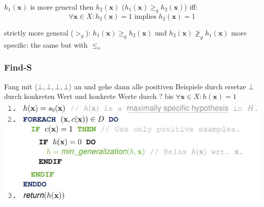 \documentclass[11pt,a4paper]{article}
\begin{document}
\begin{flushleft}
$h_1(\textbf{x})$ is more general then $h_2(\textbf{x})$ ($h_1(\textbf{x})\geq_g h_2(\textbf{x})$) iff: 
$$ \forall \textbf{x} \in X: h_2(\textbf{x})=1 \text{ implies } h_2(\textbf{x})=1 $$
 
strictly more general ($>_g$): $h_1(\textbf{x})\geq_g h_2(\textbf{x})$ und $h_2(\textbf{x})\ngeq_g h_1(\textbf{x})$
more specific: the same but with $\leq_s $ 
 
\subsubsection{Find-S}
Fang mit $ \langle \bot,\bot, \bot, \bot \rangle $ an und gehe dann alle positiven Beispiele durch
ersetze $ \bot $ durch konkreten Wert und konkrete Werte durch ? bis $\forall \textbf{x} \in X : h(\textbf{x})= 1$ 
\includegraphics[width=\textwidth]{FindS}


\end{flushleft}
\end{document}
